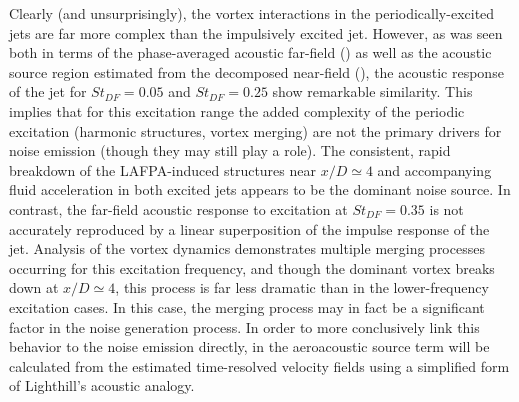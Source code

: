 Clearly (and unsurprisingly), the vortex interactions in the periodically-excited jets are far more complex than the impulsively excited jet.
However, as was seen both in terms of the phase-averaged acoustic far-field () as well as the acoustic source region estimated from the decomposed near-field (), the acoustic response of the jet for $St_{DF}=0.05$ and $St_{DF}=0.25$ show remarkable similarity.
This implies that for this excitation range the added complexity of the periodic excitation (harmonic structures, vortex merging) are not the primary drivers for noise emission (though they may still play a role).
The consistent, rapid breakdown of the LAFPA-induced structures near $x/D \simeq 4$ and accompanying fluid acceleration in both excited jets appears to be the dominant noise source. 
In contrast, the far-field acoustic response to excitation at $St_{DF}=0.35$ is not accurately reproduced by a linear superposition of the impulse response of the jet.
Analysis of the vortex dynamics demonstrates multiple merging processes occurring for this excitation frequency, and though the dominant vortex breaks down at $x/D \simeq 4$, this process is far less dramatic than in the lower-frequency excitation cases.
In this case, the merging process may in fact be a significant factor in the noise generation process.
In order to more conclusively link this behavior to the noise emission directly, in  the aeroacoustic source term will be calculated from the estimated time-resolved velocity fields using a simplified form of Lighthill's acoustic analogy.